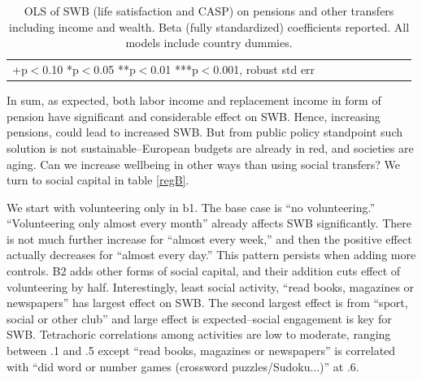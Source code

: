 \documentclass[10pt, letterpaper]{article}
\begin{document}
\begin{spacing}{1.4}

\begin{spacing}{.9}
\begin{table}[H]\centering \caption{OLS of SWB (life satisfaction and CASP) on pensions and
    other transfers including income and wealth. Beta (fully standardized)
    coefficients reported. All models
    include country dummies.}  \begin{scriptsize} \begin{tabular}{p{1.8in}p{.5in}p{.5in}p{.5in}p{.5in}|p{.5in}p{.5in}p{.5in}p{.5in}p{.5in}p{.4in}p{.5in}p{.4in}}\hline 
      \hline\multicolumn{5}{l}{+p$<$0.10 *p$<$0.05 **p$<$0.01 ***p$<$0.001,
        robust std err} \end{tabular}\label{regA} \end{scriptsize}\end{table}
\end{spacing}


In sum, as expected, both labor income and replacement income in form of pension
have  significant and considerable effect on SWB. Hence, increasing
pensions, could lead to increased SWB. But from public policy standpoint such
solution is not sustainable--European budgets are already in red,  and societies are
aging. Can we increase wellbeing in other ways than using social transfers?  We turn to social capital in table \ref{regB}.

We start with  volunteering only in b1. The base case is ``no volunteering.''
 ``Volunteering only almost every month'' already affects SWB significantly. There is not
much further increase for ``almost every week,'' and then the positive effect actually decreases for ``almost
every day.'' This pattern persists when adding more controls. B2 adds other forms
of social capital, and their addition cuts effect of volunteering by half.
%
 Interestingly, least social activity,  ``read books, magazines or newspapers'' has 
largest effect on SWB. The second largest effect is from ``sport, social or other
club'' and large effect is
expected--social engagement is key for SWB. 
Tetrachoric correlations among activities are low to moderate, ranging between .1 and .5
except ``read books, magazines or newspapers'' is
correlated with ``did word or number games (crossword puzzles/Sudoku...)'' at .6.


\end{spacing}
\end{document}
